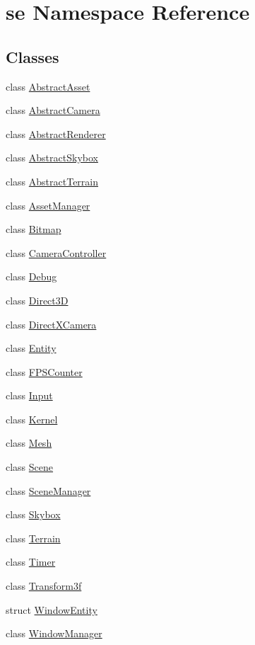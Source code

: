 \hypertarget{namespacese}{}\section{se Namespace Reference}
\label{namespacese}
\subsection*{Classes}
\begin{DoxyCompactItemize}
\item 
class \mbox{\hyperlink{classse_1_1_abstract_asset}{Abstract\+Asset}}
\item 
class \mbox{\hyperlink{classse_1_1_abstract_camera}{Abstract\+Camera}}
\item 
class \mbox{\hyperlink{classse_1_1_abstract_renderer}{Abstract\+Renderer}}
\item 
class \mbox{\hyperlink{classse_1_1_abstract_skybox}{Abstract\+Skybox}}
\item 
class \mbox{\hyperlink{classse_1_1_abstract_terrain}{Abstract\+Terrain}}
\item 
class \mbox{\hyperlink{classse_1_1_asset_manager}{Asset\+Manager}}
\item 
class \mbox{\hyperlink{classse_1_1_bitmap}{Bitmap}}
\item 
class \mbox{\hyperlink{classse_1_1_camera_controller}{Camera\+Controller}}
\item 
class \mbox{\hyperlink{classse_1_1_debug}{Debug}}
\item 
class \mbox{\hyperlink{classse_1_1_direct3_d}{Direct3D}}
\item 
class \mbox{\hyperlink{classse_1_1_direct_x_camera}{Direct\+X\+Camera}}
\item 
class \mbox{\hyperlink{classse_1_1_entity}{Entity}}
\item 
class \mbox{\hyperlink{classse_1_1_f_p_s_counter}{F\+P\+S\+Counter}}
\item 
class \mbox{\hyperlink{classse_1_1_input}{Input}}
\item 
class \mbox{\hyperlink{classse_1_1_kernel}{Kernel}}
\item 
class \mbox{\hyperlink{classse_1_1_mesh}{Mesh}}
\item 
class \mbox{\hyperlink{classse_1_1_scene}{Scene}}
\item 
class \mbox{\hyperlink{classse_1_1_scene_manager}{Scene\+Manager}}
\item 
class \mbox{\hyperlink{classse_1_1_skybox}{Skybox}}
\item 
class \mbox{\hyperlink{classse_1_1_terrain}{Terrain}}
\item 
class \mbox{\hyperlink{classse_1_1_timer}{Timer}}
\item 
class \mbox{\hyperlink{classse_1_1_transform3f}{Transform3f}}
\item 
struct \mbox{\hyperlink{structse_1_1_window_entity}{Window\+Entity}}
\item 
class \mbox{\hyperlink{classse_1_1_window_manager}{Window\+Manager}}
\end{DoxyCompactItemize}
